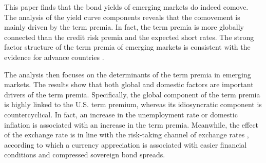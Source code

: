 {%

This paper finds that the bond yields of emerging markets do indeed comove. The analysis of the yield curve components reveals that the comovement is mainly driven by the term premia. In fact, the term premia is more globally connected than the credit risk premia and the expected short rates. The strong factor structure of the term premia of emerging markets is consistent with the evidence for advance countries \citep*{ACDM:2019}.

The analysis then focuses on the determinants of the term premia in emerging markets. The results show that both global and domestic factors are important drivers of the term premia. Specifically, the global component of the term premia is highly linked to the U.S. term premium, whereas its idiosyncratic component is countercyclical. 
In fact, an increase in the unemployment rate or domestic inflation 
is associated with an increase in the term premia. Meanwhile, the effect of the exchange rate is in line with the risk-taking channel of exchange rates \citep*{HofmannShimShin:2017}, according to which a currency appreciation is associated with easier financial conditions and compressed sovereign bond spreads.



}
